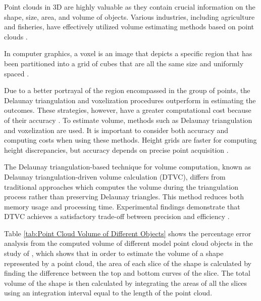Point clouds in 3D are highly valuable as they contain crucial information on the shape, size, area, and volume of objects. Various industries, including agriculture and fisheries, have effectively utilized volume estimating methods based on point clouds \citep{geuvara2020}.

In computer graphics, a voxel is an image that depicts a specific region that has been partitioned into a grid of cubes that are all the same size and uniformly spaced \citep{putman2018}.

Due to a better portrayal of the region encompassed in the group of points, the Delaunay triangulation and voxelization procedures outperform in estimating the outcomes. These strategies, however, have a greater computational cost because of their accuracy \citep{chee2015}. To estimate volume, methods such as Delaunay triangulation and voxelization are used. It is important to consider both accuracy and computing costs when using these methods. Height grids are faster for computing height discrepancies, but accuracy depends on precise point acquisition \citep{bewley2011, duff2000}.

The Delaunay triangulation-based technique for volume computation, known as Delaunay triangulation-driven volume calculation (DTVC), differs from traditional approaches which computes the volume during the triangulation process rather than preserving Delaunay triangles. This method reduces both memory usage and processing time. Experimental findings demonstrate that DTVC achieves a satisfactory trade-off between precision and efficiency \citep{liuY2021}.

Table \ref{tab:Point Cloud Volume of Different Objects} shows the percentage error analysis from the computed volume of different model point cloud objects in the study of \citet{chang2017}, which shows that in order to estimate the volume of a shape represented by a point cloud, the area of each slice of the shape is calculated by finding the difference between the top and bottom curves of the slice. The total volume of the shape is then calculated by integrating the areas of all the slices using an integration interval equal to the length of the point cloud.

